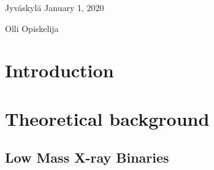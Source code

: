 \documentclass[final]{thesis} %
\begin{document}
\bigskip

\noindent Jyväskylä January 1, 2020

\bigskip

\noindent Olli Opiskelija

\tableofcontents

\section{Introduction}
\label{sec:introduction}


\begin{comment}
Johdannon tehtävänä on nimensä mukaisesti johdatella lukija käsillä olevan tutkimuksen maailmaan. Tutkiminen ja kirjoittaminen kuuluvat yhteen. Tutkimus on monella alalla, varsinkin niin sanotuissa ihmistieteissä, pelkistetysti sanottuna kirjoitusprosessi. Sen päämäärä on ajattelun tulos, kirkastunut ydin niistä ajatuksista ja johtopäätöksistä, joita prosessin aikana on syntynyt. Kirjoittaminen jäsentää ajattelua ja synnyttää uusia ideoita. Siksi kirjoittaminen on olennainen osa sekä opiskelua, tutkimusta että lopulta myös ammattitaitoa. Kirjoitustaitoa tarvitaan läpi työelämän: lähes kaikissa akateemisissa ammateissa laaditaan muistioita, virkakirjeitä, raportteja, tiedotteita tai suunnitelmia.

Kielijelpin kirjoitusviestinnän sivuilla keskitytään tieteellisen kirjoittamisen perusasioihin, kirjoitusprosessiin ja tekstin viimeistelyyn. Kielijelppi lähestyy tieteellistä kirjoittamista laadullisen tutkimuksen näkökulmasta, koska Kielijelpin kirjoitusviestinnän tekijöiden tausta ja kokemus ovat laadullisen humanistisen tutkimuksen parissa. Sivustosta on toivottavasti kuitenkin iloa myös muunlaista tutkimusta tekeville.

\lipsum[1]
\end{comment}


\section{Theoretical background}
\label{sec:theory-background}

\subsection{Low Mass X-ray Binaries}
\label{sec:lmxbs}
\end{document}
